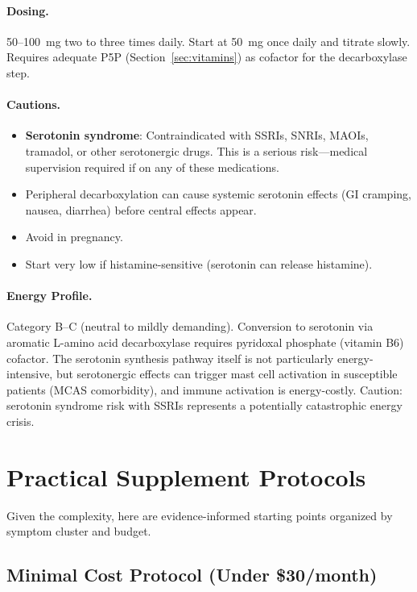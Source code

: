 \paragraph{Dosing.} 50--100~mg two to three times daily. Start at 50~mg once daily and titrate slowly. Requires adequate P5P (Section~\ref{sec:vitamins}) as cofactor for the decarboxylase step.

\paragraph{Cautions.}
\begin{itemize}
    \item \textbf{Serotonin syndrome}: Contraindicated with SSRIs, SNRIs, MAOIs, tramadol, or other serotonergic drugs. This is a serious risk---medical supervision required if on any of these medications.
    \item Peripheral decarboxylation can cause systemic serotonin effects (GI cramping, nausea, diarrhea) before central effects appear.
    \item Avoid in pregnancy.
    \item Start very low if histamine-sensitive (serotonin can release histamine).
\end{itemize}

\paragraph{Energy Profile.}
Category B--C (neutral to mildly demanding). Conversion to serotonin via aromatic L-amino acid decarboxylase requires pyridoxal phosphate (vitamin B6) cofactor. The serotonin synthesis pathway itself is not particularly energy-intensive, but serotonergic effects can trigger mast cell activation in susceptible patients (MCAS comorbidity), and immune activation is energy-costly. Caution: serotonin syndrome risk with SSRIs represents a potentially catastrophic energy crisis.

\section{Practical Supplement Protocols}
\label{sec:protocols}

Given the complexity, here are evidence-informed starting points organized by symptom cluster and budget.

\subsection{Minimal Cost Protocol (Under \$30/month)}

